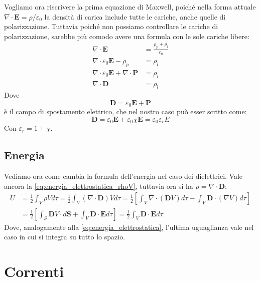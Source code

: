 \documentclass{article}
\renewcommand{\epsilon}{\varepsilon}
\newcommand{\ez}{\epsilon_0}
\newcommand{\mbf}{\mathbf}
\newcommand{\grad}[1][]{\nabla#1}
\renewcommand{\div}[1][]{\nabla#1 \cdot}
\numberwithin{equation}{section}
\begin{document}
Vogliamo ora riscrivere la prima equazione di Maxwell, poiché nella forma attuale $\div \mbf E = \rho /\ez$ la densità di carica include tutte le cariche, anche quelle di polarizzazione. Tuttavia poiché non possiamo controllare le cariche di polarizzazione, sarebbe più comodo avere una formula con le sole cariche libere:
\begin{align}
    \div \mbf E     &= \frac{ \rho_p + \rho_l }{ \ez }  \\
    \div \ez \mbf E - \rho_p &= \rho_l \\
    \div \ez \mbf E + \div \mbf P &= \rho_l \\
    \div \mbf D &= \rho_l 
\end{align}
Dove 
\begin{equation}
    \mbf D = \ez \mbf E + \mbf P
\end{equation}
è il campo di spostamento elettrico, che nel nostro caso può esser scritto come:
\begin{equation}
    \mbf D = \ez \mbf E + \ez \chi \mbf E = \ez \epsilon_r E
\end{equation}
Con $\epsilon_r = 1 + \chi $.


\subsection{Energia} %
\label{sub:energia}

Vediamo ora come cambia la formula dell'energia nel caso dei dielettrici.
Vale ancora la \ref{eq:energia_elettrostatica_rhoV}, tuttavia ora si ha $\rho = \div \mbf D$:
\begin{align*} 
    U   &= \frac{ 1 }{ 2 } \int_V \rho V d\tau 
        = \frac{ 1 }{ 2 } \int_V (\div \mbf D) V d\tau 
        = \frac{ 1 }{ 2 } \left [ \int_V \div (\mbf DV) d\tau - \int_V \mbf D \cdot (\grad V) d\tau \right ] \\
        &= \frac{ 1 }{ 2 } \left [ \int_S \mbf DV \cdot d\mbf S + \int_V \mbf D \cdot \mbf E d\tau \right ]
        = \frac{ 1 }{ 2 } \int_V \mbf D \cdot \mbf E d\tau 
\end{align*}
Dove, analogamente alla \ref{eq:energia_elettrostatica}, l'ultima uguaglianza vale nel caso in cui si integra su tutto lo spazio.



\section{Correnti} %
\label{sec:correnti}
\end{document}
